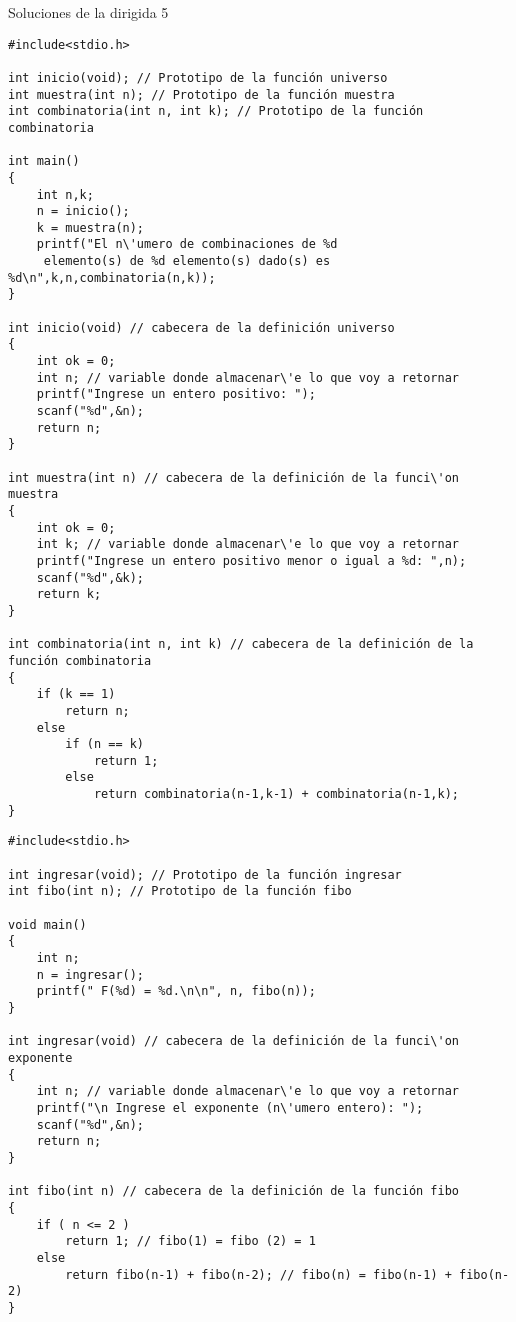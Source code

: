 \documentclass[twoside,10.5pt]{article}%
\begin{document}
\begin{center}
{\LARGE{Soluciones de la dirigida 5}}\\[20pt]
\end{center}

\vspace{0.3cm}




\begin{verbatim}
#include<stdio.h>

int inicio(void); // Prototipo de la función universo
int muestra(int n); // Prototipo de la función muestra
int combinatoria(int n, int k); // Prototipo de la función combinatoria

int main()
{
	int n,k; 
	n = inicio();	
	k = muestra(n);
	printf("El n\'umero de combinaciones de %d
	 elemento(s) de %d elemento(s) dado(s) es %d\n",k,n,combinatoria(n,k));	
}

int inicio(void) // cabecera de la definición universo
{
	int ok = 0; 
	int n; // variable donde almacenar\'e lo que voy a retornar
	printf("Ingrese un entero positivo: "); 
	scanf("%d",&n);
	return n;
}

int muestra(int n) // cabecera de la definición de la funci\'on muestra
{
	int ok = 0; 
	int k; // variable donde almacenar\'e lo que voy a retornar
	printf("Ingrese un entero positivo menor o igual a %d: ",n); 
	scanf("%d",&k);
	return k;
}
		
int combinatoria(int n, int k) // cabecera de la definición de la función combinatoria
{
	if (k == 1)	
		return n;
	else
		if (n == k)
			return 1;
		else
			return combinatoria(n-1,k-1) + combinatoria(n-1,k);
}
\end{verbatim}


\vspace{0.3cm}


\begin{verbatim}
#include<stdio.h>

int ingresar(void); // Prototipo de la función ingresar
int fibo(int n); // Prototipo de la función fibo

void main()
{
	int n; 
	n = ingresar();
	printf(" F(%d) = %d.\n\n", n, fibo(n));
}

int ingresar(void) // cabecera de la definición de la funci\'on exponente
{
	int n; // variable donde almacenar\'e lo que voy a retornar
	printf("\n Ingrese el exponente (n\'umero entero): "); 
	scanf("%d",&n);
	return n;
}
	
int fibo(int n) // cabecera de la definición de la función fibo
{ 
	if ( n <= 2 ) 
		return 1; // fibo(1) = fibo (2) = 1
	else
		return fibo(n-1) + fibo(n-2); // fibo(n) = fibo(n-1) + fibo(n-2)
}
\end{verbatim}
\end{document}
